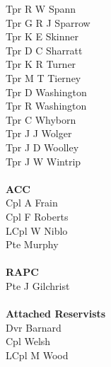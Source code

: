 \begin{multicols}{4}
  Tpr R W Spann \\
  Tpr G R J Sparrow \\
  Tpr K E Skinner \\
  Tpr D C Sharratt \\
  Tpr K R Turner \\
  Tpr M T Tierney \\
  Tpr D Washington \\
  Tpr R Washington \\
  Tpr C Whyborn \\
  Tpr J J Wolger \\
  Tpr J D Woolley \\
  Tpr J W Wintrip \\
  \\
  \textbf{ACC} \\
  Cpl A Frain \\
  Cpl F Roberts \\
  LCpl W Niblo \\
  Pte Murphy \\
  \\
  \textbf{RAPC} \\
  Pte J Gilchrist \\
  \\
  \textbf{Attached Reservists} \\
  Dvr Barnard \\
  Cpl Welsh \\
  LCpl M Wood
\end{multicols}

\pagebreak
